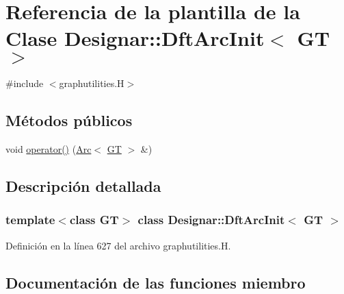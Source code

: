 \hypertarget{class_designar_1_1_dft_arc_init}{}\section{Referencia de la plantilla de la Clase Designar\+:\+:Dft\+Arc\+Init$<$ GT $>$}
\label{class_designar_1_1_dft_arc_init}


{\ttfamily \#include $<$graphutilities.\+H$>$}

\subsection*{Métodos públicos}
\begin{DoxyCompactItemize}
\item 
void \hyperlink{class_designar_1_1_dft_arc_init_a93a8fffe70b19c86510dd4c2588d6249}{operator()} (\hyperlink{namespace_designar_a3f55fb5513d62ff47cbc8f72b8e95d6f}{Arc}$<$ \hyperlink{demo-buildgraph_8_c_a3001c40d2c31ca87ed96cd7d1334a55e}{GT} $>$ \&)
\end{DoxyCompactItemize}


\subsection{Descripción detallada}
\subsubsection*{template$<$class GT$>$\newline
class Designar\+::\+Dft\+Arc\+Init$<$ G\+T $>$}



Definición en la línea 627 del archivo graphutilities.\+H.



\subsection{Documentación de las funciones miembro}
\mbox{\label{class_designar_1_1_dft_arc_init_a93a8fffe70b19c86510dd4c2588d6249}} 
